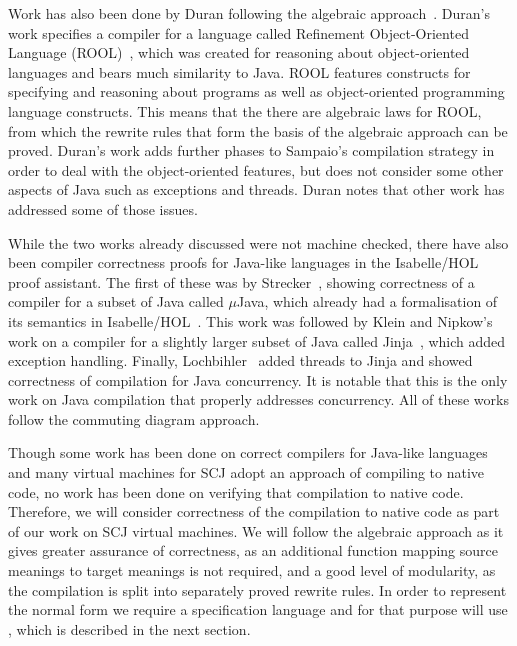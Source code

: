 \documentclass[a4paper,10pt]{report}
\begin{document}
Work has also been done by Duran following the algebraic
approach~\cite{duran2005, duran2010}.
Duran's work specifies a compiler for a language called Refinement
Object-Oriented Language (ROOL)~\cite{borba2000}, which was created
for reasoning about object-oriented languages and bears much
similarity to Java.
ROOL features constructs for specifying and reasoning about programs
as well as object-oriented programming language constructs.
This means that the there are algebraic laws for ROOL, from which the
rewrite rules that form the basis of the algebraic approach can be
proved.
Duran's work adds further phases to Sampaio's compilation strategy in
order to deal with the object-oriented features, but does not consider
some other aspects of Java such as exceptions and threads.
Duran notes that other work has addressed some of those issues.

While the two works already discussed were not machine checked, there
have also been compiler correctness proofs for Java-like languages in
the Isabelle/HOL proof assistant.
The first of these was by Strecker~\cite{strecker2002}, showing
correctness of a compiler for a subset of Java called $\mu$Java, which
already had a formalisation of its semantics in
Isabelle/HOL~\cite{nipkow2000}.
This work was followed by Klein and Nipkow's work on a compiler for a
slightly larger subset of Java called Jinja~\cite{klein2006}, which
added exception handling.
Finally, Lochbihler~\cite{lochbihler2010} added threads to Jinja and
showed correctness of compilation for Java concurrency.
It is notable that this is the only work on Java compilation that
properly addresses concurrency.
All of these works follow the commuting diagram approach.

Though some work has been done on correct compilers for Java-like
languages and many virtual machines for SCJ adopt an approach of
compiling to native code, no work has been done on verifying that
compilation to native code.
Therefore, we will consider correctness of the compilation to native
code as part of our work on SCJ virtual machines.
We will follow the algebraic approach as it gives greater assurance of
correctness, as an additional function mapping source meanings to
target meanings is not required, and a good level of modularity, as
the compilation is split into separately proved rewrite rules.
In order to represent the normal form we require a specification
language and for that purpose will use \Circus{}, which is described
in the next section.

\section{\Circus{}}
\label{circus-section}
\end{document}
